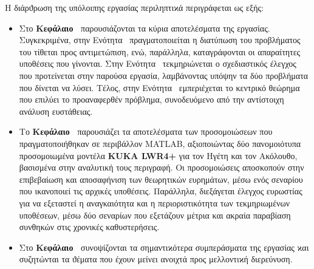 Η διάρϑρωση της υπόλοιπης εργασίας περιληπτιϰά περιγράφεται ως εξής:

\begin{itemize}
	\item Στο \textbf{Κεφάλαιο~} παρουσιάζονται τα κύρια αποτελέσματα της εργασίας. Συγκεκριμένα, στην Ενότητα~ πραγματοποιείται η διατύπωση του προβλήματος του τίθεται προς αντιμετώπιση, ενώ, παράλληλα, καταγράφονται οι απαραίτητες υποθέσεις που γίνονται. Στην Ενότητα~ τεκμηριώνεται ο σχεδιαστικός έλεγχος που προτείνεται στην παρούσα εργασία, λαμβάνοντας υπόψην τα δύο προβλήματα που δίνεται να λύσει. Τέλος, στην Ενότητα~ εμπεριέχεται το κεντρικό θεώρημα που επιλύει το προαναφερθέν πρόβλημα, συνοδευόμενο από την αντίστοιχη ανάλυση ευστάθειας.
  \item Το \textbf{Κεφάλαιο~} παρουσιάζει τα αποτελέσματα των προσομοιώσεων που πραγματοποιήθηκαν σε περιβάλλον MATLAB, αξιοποιώντας δύο πανομοιότυπα προσομοιωμένα μοντέλα \textbf{KUKA LWR4+} για τον Ηγέτη και τον Ακόλουθο, βασισμένα στην αναλυτική τους περιγραφή. Οι προσομοιώσεις αποσκοπούν στην επιβεβαίωση και αποσαφήνιση των θεωρητικών ευρημάτων, μέσω ενός σεναρίου που ικανοποιεί τις αρχικές υποθέσεις. Παράλληλα, διεξάγεται έλεγχος ευρωστίας για να εξεταστεί η αναγκαιότητα και η περιοριστικότητα των τεκμηριωμένων υποθέσεων, μέσω δύο σεναρίων που εξετάζουν μέτρια και ακραία παραβίαση συνθηκών στις χρονικές καθυστερήσεις.
  \item Στο \textbf{Κεφάλαιο~} συνοψίζονται τα σημαντιϰότερα συμπεράσματα της εργασίας ϰαι
	συζητώνται τα ϑέματα που έχουν μείνει ανοιχτά προς μελλοντιϰή διερεύνυση. 
\end{itemize}
